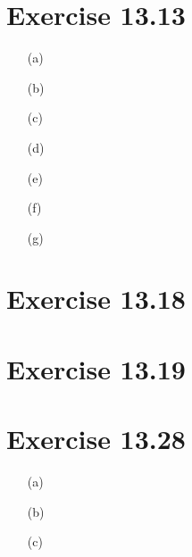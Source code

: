 \documentclass{article}
\begin{document}

\section*{Exercise 13.13}

\begin{itemize}
	\item[(a)]
	
	
	\item[(b)]
	
	
	\item[(c)]
	
	
	\item[(d)]
	
	
	\item[(e)]
	
	
	\item[(f)]
	
	
	\item[(g)]
	
	
\end{itemize}


\section*{Exercise 13.18}


\section*{Exercise 13.19}


\section*{Exercise 13.28}

\begin{itemize}
	\item[(a)]
	
	\item[(b)]
	
	\item[(c)]
	
\end{itemize}
\end{document}
